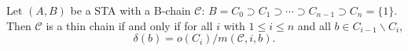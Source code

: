 \begin{thm}
\label{thm:thin-by-number}
Let $(A, B)$ be a STA with a B-chain $\mathcal{C}$: $B = C_0 \supset C_1
\supset \cdots \supset C_{n-1} \supset C_n = \{1\}$. Then $\mathcal{C}$
is a thin chain if and only if for all $i$ with $1 \leq i \leq n$ and
all $b \in C_{i-1}\backslash C_i$,
\[
\delta(b) = o(C_i)/m(\mathcal{C}, i, b).
\]
\end{thm}
